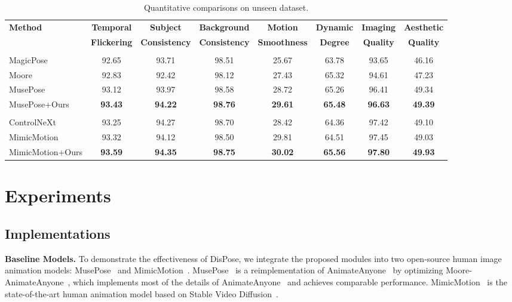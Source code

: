 \begin{table}[t]
\caption{Quantitative comparisons on unseen dataset.}
\vspace{5pt}
\scriptsize
\centering
\setlength{\tabcolsep}{5pt}
\begin{tabular}{lccccccc}
\toprule		
\multirow{2}{*}{\textbf{Method}}
                        & \textbf{Temporal}    & \textbf{Subject}      & \textbf{Background} & \textbf{Motion} & \textbf{Dynamic} & \textbf{Imaging} & \textbf{Aesthetic} \\
                         & \textbf{Flickering}    & \textbf{Consistency}  & \textbf{Consistency} & \textbf{Smoothness} & \textbf{Degree} & \textbf{Quality} & \textbf{Quality} \\
\midrule
\multicolumn{8}{l}{\color{gray}{\emph{Stable Diffusion1.5}}} \\
MagicPose~\citep{chang2023magicpose}  & 92.65& 93.71 & 98.51 & 25.67 & 63.78 & 93.65 & 46.16\\
Moore~\citep{moore-animateanyone}  & 92.83 & 92.42 & 98.12 & 27.43 & 65.32 & 94.61& 47.23\\
MusePose~\citep{musepose}  & 93.12 & 93.97 & 98.58 & 28.72 & 65.26 & 96.41 & 49.34\\
\rowcolor{aliceblue!60}
MusePose+Ours	 &  \textbf{93.43} & \textbf{94.22} & \textbf{98.76} & \textbf{29.61} & \textbf{65.48} & \textbf{96.63} & \textbf{49.39} \\
\midrule
\multicolumn{8}{l}{\color{gray}{\emph{Stable Video Diffusion}}} \\
ControlNeXt~\citep{peng2024controlnext}	 & 93.25 & 94.27 & 98.70 & 28.42 & 64.36 & 97.42 & 49.10 \\
MimicMotion~\citep{zhang2024mimicmotion}	 & 93.32 & 94.12 & 98.50 & 29.81 & 64.51 & 97.45 & 49.03 \\
\rowcolor{aliceblue!60}
MimicMotion+Ours  & \textbf{93.59} & \textbf{94.35}& \textbf{98.75}& \textbf{30.02} & \textbf{65.56}& \textbf{97.80}  & \textbf{49.93}\\
\bottomrule
\end{tabular}
\label{tab: ood exp}
\end{table}

\section{Experiments}
\subsection{Implementations}
\textbf{Baseline Models.}
To demonstrate the effectiveness of DisPose, we integrate the proposed modules into two open-source human image animation models: MusePose~\citep{musepose} and MimicMotion~\citep{zhang2024mimicmotion}.
MusePose~\citep{musepose} is a reimplementation of AnimateAnyone~\citep{hu2023animate} by optimizing Moore-AnimateAnyone~\citep{moore-animateanyone}, which implements most of the details of AnimateAnyone~\citep{hu2023animate} and achieves comparable performance. MimicMotion~\citep{zhang2024mimicmotion} is the state-of-the-art human animation model based on Stable Video Diffusion~\citep{blattmann2023svd}.

